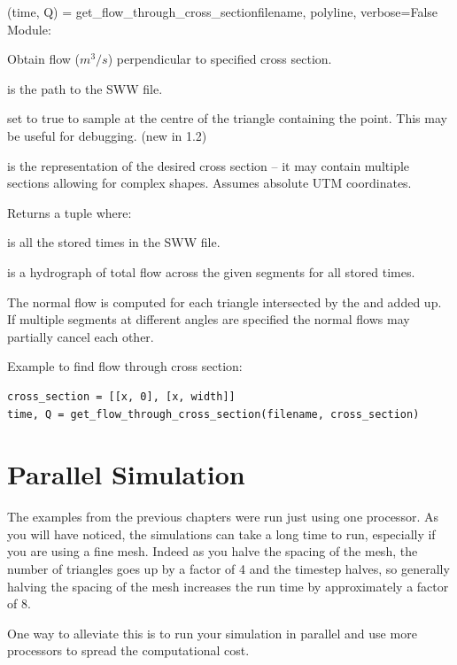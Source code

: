 \documentclass{manual}
\begin{document}
\begin{funcdesc}{(time, Q) = get_flow_through_cross_section}{filename, polyline, verbose=False}
Module: 

Obtain flow ($m^3/s$) perpendicular to specified cross section.

 is the path to the SWW file.

 set to true to sample at the centre of the triangle containing the point.
This may be useful for debugging. (new in 1.2)

 is the representation of the desired cross section -- it may contain
multiple sections allowing for complex shapes. Assumes absolute UTM coordinates.

Returns a tuple  where:

 is all the stored times in the SWW file.

 is a hydrograph of total flow across the given segments for all stored times.

The normal flow is computed for each triangle intersected by the  and
added up.  If multiple segments at different angles are specified the normal flows
may partially cancel each other.

Example to find flow through cross section:

\begin{verbatim}
cross_section = [[x, 0], [x, width]]
time, Q = get_flow_through_cross_section(filename, cross_section)
\end{verbatim}
\end{funcdesc}


\chapter{Parallel Simulation}

The examples from the previous chapters were run just using one processor. As you will have noticed, the simulations can take a long time to run, especially if you are using a fine mesh. Indeed as you halve the spacing of the mesh, the number of triangles goes up by a factor of 4 and the timestep halves, so generally halving the spacing of the mesh increases the run time by approximately a factor of 8. 

One way to alleviate this is to run your simulation in parallel and use more processors to spread the computational cost. 
\end{document}
